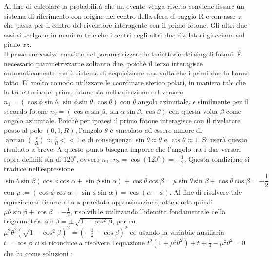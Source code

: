   Al fine di calcolare la probabilità che un evento venga rivelto conviene fissare un sistema di riferimento con origine nel centro della sfera di raggio R
  e con asse \(z\) che passa per il centro del rivelatore interagente con il primo fotone. Gli altri due assi si scelgono in maniera tale che i centri degli altri due rivelatori
  giacciano sul piano \(xz\).\\
  
  

  Il passo successivo consiste nel parametrizzare le traiettorie dei singoli fotoni. \'E necessario parametrizzarne soltanto due, poichè il terzo interagisce automaticamente con il
  sistema di acquisizione una volta che i primi due lo hanno fatto. E' molto comodo utilizzare le coordinate sferico polari, in maniera tale che la traiettoria del primo fotone sia 
  nella direzione del versore \(n_1 = \left( \cos \phi \sin \theta , \sin \phi \sin \theta, \cos \theta  \right)\) con \(\theta\) angolo azimutale, e similmente per il secondo fotone
  \(n_2 = \left( \cos \alpha \sin \beta , \sin \alpha \sin \beta, \cos \beta  \right)\) con questa volta \(\beta\) come angolo azimutale. Poichè per ipotesi il primo fotone
  interagisce con il rivelatore posto al polo \(\left(0,0,R \right)\), l'angolo \(\theta\) è vincolato ad essere minore di \(\arctan\left(\ \frac{r}{R} \right) \approx \frac{r}{R} << 1 \)
  e di conseguenza \(\sin \theta \approx \theta \) e \(\cos \theta \approx 1 \). Si userà questo risultato a breve. A questo punto bisogna imporre che l'angolo tra i due versori sopra 
  definiti sia di \(120^\circ\), ovvero \(n_1 \cdot n_2 = \cos (120^\circ) = -\frac{1}{2}\). Questa condizione si traduce nell'espressione \[\sin \theta \sin \beta \left( \cos \phi \cos \alpha
  + \sin \phi \sin \alpha \right) + \cos \theta \cos \beta = \mu \sin \theta \sin \beta  + \cos \theta \cos \beta =-\frac{1}{2}\] con \(\mu := \left( \cos \phi \cos \alpha + 
  \sin \phi \sin \alpha \right) = \cos \left( \alpha - \phi \right) \). Al fine di risolvere tale equazione si ricorre alla sopracitata approsimazione, ottenendo quindi 
  \( \mu \theta \sin \beta + \cos \beta = -\frac{1}{2}\), risolvibile utilizzando l'identita fondamentale della trigonmetria \(\sin \beta = \pm \sqrt{1 - \cos^2 \beta}\), per cui
  \(\mu^2 \theta^2 \left( \sqrt{ 1 - \cos^2 \beta } \right)^2 = \left( -\frac{1}{2} - \cos \beta \right)^2  \) ed usando la variabile ausiliaria \(t = \cos \beta\) ci si riconduce 
  a risolvere l'equazione \(t^2 \left( 1 + \mu^2 \theta^2 \right) + t + \frac{1}{4} - \mu^2 \theta^2=0\) che ha come soluzioni :
